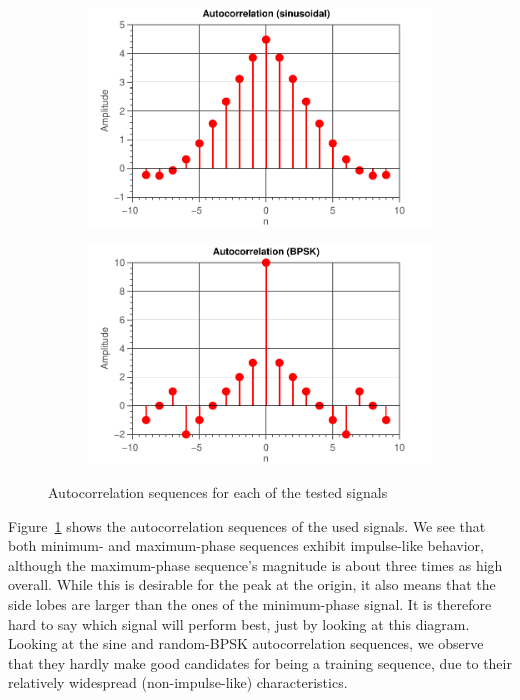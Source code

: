 \documentclass[11pt,titlepage]{report}
\begin{document}
\begin{figure}[H]
\begin{subfigure}{0.49\textwidth}
	\end{subfigure}
	\begin{subfigure}{0.49\textwidth}
		\includegraphics[width=\textwidth]{../../deliverable-7-resources/figures/ass-1/report-8-9-10/report-8/ass-1-report-8-sinusoidal-sinusoidal.pdf}
	\end{subfigure}
	\begin{subfigure}{0.49\textwidth}
		\includegraphics[width=\textwidth]{../../deliverable-7-resources/figures/ass-1/report-8-9-10/report-8/ass-1-report-8-BPSK-BPSK.pdf}
	\end{subfigure}
	\caption{Autocorrelation sequences for each of the tested signals}
	\label{fig:rep8-autocor}
\end{figure}

Figure~\ref{fig:rep8-autocor} shows the autocorrelation sequences of the used signals. We see that both minimum- and maximum-phase sequences exhibit impulse-like behavior, although the maximum-phase sequence's magnitude is about three times as high overall. While this is desirable for the peak at the origin, it also means that the side lobes are larger than the ones of the minimum-phase signal. It is therefore hard to say which signal will perform best, just by looking at this diagram. Looking at the sine and random-BPSK autocorrelation sequences, we observe that they hardly make good candidates for being a training sequence, due to their relatively widespread (non-impulse-like) characteristics.
\end{document}
